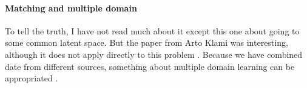 \paragraph{Matching and multiple domain} To tell the truth, I have not read
much about it except this one \autocite{iwata2013unsupervised} about going to
some common latent space. But the paper from Arto Klami was interesting,
although it does not apply directly to this problem \autocite{Klami2013}.
Because we have combined date from different sources, something about multiple
domain learning can be appropriated \autocites{Crammer2008}{Ben-David2009}.
